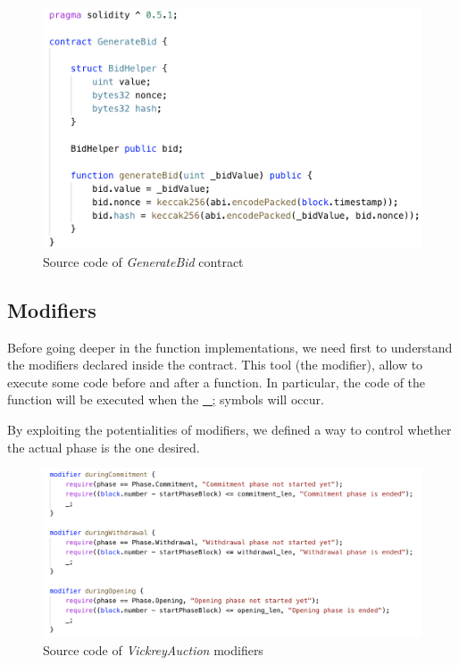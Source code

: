 \documentclass[runningheads,a4paper]{llncs}
\begin{document}
\begin{figure}[h]
\includegraphics[width=0.7\linewidth]{images/generateBid.png}
\centering
\caption{Source code of \emph{GenerateBid} contract}
\label{fig:GenerateBid}
\end{figure}




\newpage
\subsection{Modifiers}
Before going deeper in the function implementations, we need first to understand the modifiers declared inside the contract. This tool (the modifier), allow to execute some code before and after a function. In particular, the code of the function will be executed when the \url{_;} symbols will occur.

By exploiting the potentialities of modifiers, we defined a way to control whether the actual phase is the one desired.


\begin{figure}[h]
\includegraphics[width=\linewidth]{images/vickreyModifier.png}
\centering
\caption{Source code of \emph{VickreyAuction} modifiers}
\label{fig:vickreyModifiers}
\end{figure}
\end{document}
